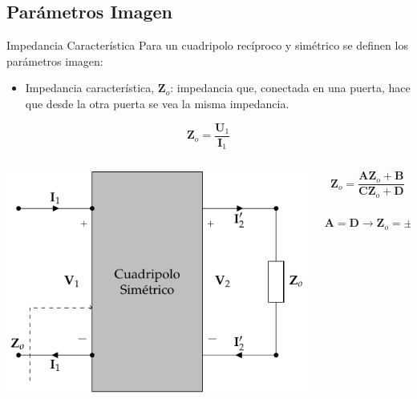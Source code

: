 \documentclass[xcolor={usenames,svgnames,dvipsnames}]{beamer}
\begin{document}
\subsection{Parámetros Imagen}
\label{sec:org5f4e5de}

\begin{frame}[label={sec:org49d5911}]{Impedancia Característica}
Para un cuadripolo \alert{recíproco} y \alert{simétrico} se definen los parámetros imagen:

\begin{itemize}
\item \alert{Impedancia característica}, \(\mathbf{Z}_o\): impedancia que, conectada en una puerta, hace que desde la otra puerta se vea la misma impedancia.
\end{itemize}
\[
  \mathbf{Z}_o = \frac{\mathbf{U}_1}{\mathbf{I}_1}
\]

\begin{columns}
\begin{column}{0.7\columnwidth}
\begin{center}
\includegraphics[width=.9\linewidth]{figs/cuadripolo_impedancia_caracteristica.pdf}
\end{center}
\end{column}

\begin{column}{0.4\columnwidth}
\[
\mathbf{Z}_o = \frac{\mathbf{A} \mathbf{Z}_o + \mathbf{B}}{\mathbf{C}\mathbf{Z}_o + \mathbf{D}}
\]

\[
\mathbf{A} = \mathbf{D} \rightarrow \boxed{\mathbf{Z}_o = \pm \sqrt{\frac{\mathbf{B}}{\mathbf{C}}}}
\]
\end{column}
\end{columns}
\end{frame}
\end{document}
